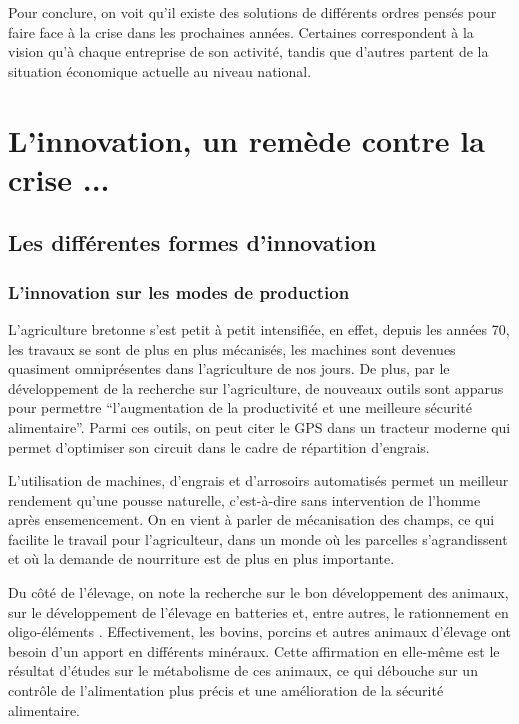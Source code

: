 \documentclass[a4paper,10pt]{report}
\begin{document}
			Pour conclure, on voit qu’il existe des solutions de différents ordres pensés pour faire face à la crise dans les prochaines années. Certaines correspondent à la vision qu’à chaque entreprise de son activité, tandis que d’autres partent de la situation économique actuelle au niveau national.
			
\chapter{L'innovation, un remède contre la crise ...}
	
	\section{Les différentes formes d'innovation}
	
		\subsection{L'innovation sur les modes de production}
			L’agriculture bretonne s’est petit à petit intensifiée, en effet, depuis les années 70, les travaux se sont de plus en plus mécanisés, les machines sont devenues quasiment omniprésentes dans l’agriculture de nos jours. De plus, par le développement de la recherche sur l’agriculture, de nouveaux outils sont apparus pour permettre “l’augmentation de la productivité et une meilleure sécurité alimentaire”. Parmi ces outils, on peut citer le GPS dans un tracteur moderne qui permet d’optimiser son circuit dans le cadre de répartition d’engrais.
			
			
			L’utilisation de machines, d’engrais et d’arrosoirs automatisés permet un meilleur rendement qu’une pousse naturelle, c’est-à-dire sans intervention de l’homme après ensemencement. On en vient à parler de mécanisation des champs, ce qui facilite le travail pour l’agriculteur, dans un monde où les parcelles s’agrandissent et où la demande de nourriture est de plus en plus importante.
			
			Du côté de l’élevage, on note la recherche sur le bon développement des animaux, sur le développement de l’élevage en batteries et, entre autres, le rationnement en oligo-éléments . Effectivement, les bovins, porcins et autres animaux d’élevage ont besoin d’un apport en différents minéraux. Cette affirmation en elle-même est le résultat d’études sur le métabolisme de ces animaux, ce qui débouche sur un contrôle de l’alimentation plus précis et une amélioration de la sécurité alimentaire.
			
\end{document}
